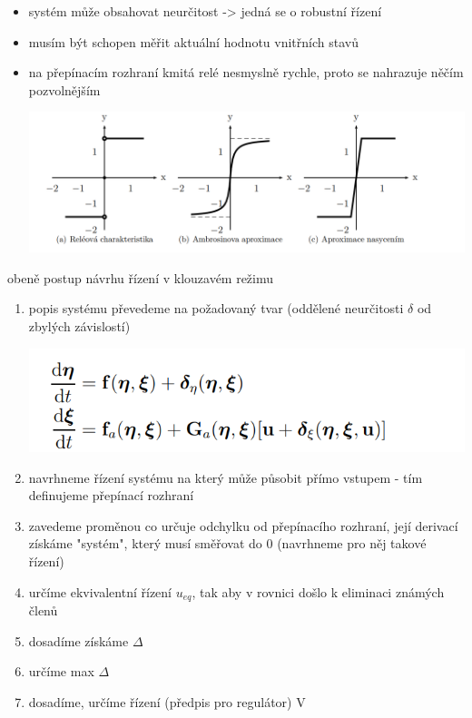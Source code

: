 \begin{itemize}
    \item systém může obsahovat neurčitost -> jedná se o robustní řízení
    \item musím být schopen měřit aktuální hodnotu vnitřních stavů
    \item na přepínacím rozhraní kmitá relé nesmyslně rychle, proto se nahrazuje něčím pozvolnějším

          \includegraphics[scale = 0.5]{img/kluzavy_rele.png}

\end{itemize}

obeně postup návrhu řízení v klouzavém režimu
\begin{enumerate}
    \item popis systému převedeme na požadovaný tvar (oddělené neurčitosti $\delta $ od zbylých závislostí)

          \includegraphics[scale =0.4]{img/klouzavy_tavr.png}
    \item navrhneme řízení systému na který může působit přímo vstupem - tím definujeme přepínací rozhraní
    \item zavedeme proměnou co určuje odchylku od přepínacího rozhraní, její derivací získáme "systém", který musí směřovat do 0 (navrhneme pro něj takové řízení)
    \item určíme ekvivalentní řízení $u_{eq}$, tak aby v rovnici došlo k eliminaci známých členů
    \item dosadíme získáme $\Delta$
    \item určíme max $\Delta$
    \item dosadíme, určíme řízení (předpis pro regulátor) V

\end{enumerate}

